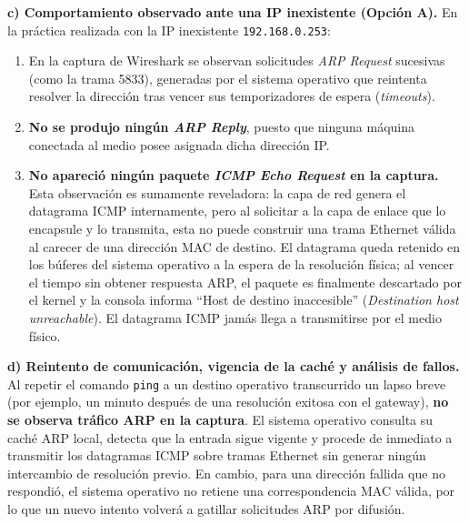 \documentclass[12pt,a4paper]{article}
\begin{document}
\textbf{c) Comportamiento observado ante una IP inexistente (Opción A).}
En la práctica realizada con la IP inexistente \texttt{192.168.0.253}:
\begin{enumerate}
    \item En la captura de Wireshark se observan solicitudes \emph{ARP Request} sucesivas (como la trama 5833), generadas por el sistema operativo que reintenta resolver la dirección tras vencer sus temporizadores de espera (\emph{timeouts}).
    \item \textbf{No se produjo ningún \emph{ARP Reply}}, puesto que ninguna máquina conectada al medio posee asignada dicha dirección IP.
    \item \textbf{No apareció ningún paquete \emph{ICMP Echo Request} en la captura.} Esta observación es sumamente reveladora: la capa de red genera el datagrama ICMP internamente, pero al solicitar a la capa de enlace que lo encapsule y lo transmita, esta no puede construir una trama Ethernet válida al carecer de una dirección MAC de destino. El datagrama queda retenido en los búferes del sistema operativo a la espera de la resolución física; al vencer el tiempo sin obtener respuesta ARP, el paquete es finalmente descartado por el kernel y la consola informa ``Host de destino inaccesible'' (\emph{Destination host unreachable}). El datagrama ICMP jamás llega a transmitirse por el medio físico.
\end{enumerate}

\textbf{d) Reintento de comunicación, vigencia de la caché y análisis de fallos.}
Al repetir el comando \texttt{ping} a un destino operativo transcurrido un lapso breve (por ejemplo, un minuto después de una resolución exitosa con el gateway), \textbf{no se observa tráfico ARP en la captura}. El sistema operativo consulta su caché ARP local, detecta que la entrada sigue vigente y procede de inmediato a transmitir los datagramas ICMP sobre tramas Ethernet sin generar ningún intercambio de resolución previo. En cambio, para una dirección fallida que no respondió, el sistema operativo no retiene una correspondencia MAC válida, por lo que un nuevo intento volverá a gatillar solicitudes ARP por difusión.
\end{document}
